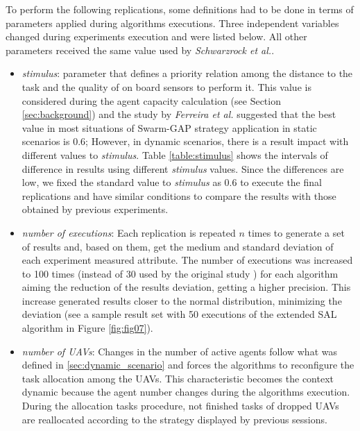 To perform the following replications, some definitions had to be done in terms of parameters applied during algorithms executions. Three independent variables changed during experiments execution and were listed below. All other parameters received the same value used by \textit{Schwarzrock et al.}\cite{MAS07}.
\begin{itemize}
   \item \textit{stimulus}: parameter that defines a priority relation among the distance to the task and the quality of on board sensors to perform it. This value is considered during the agent capacity calculation (see Section \ref{sec:background}) and the study by \textit{Ferreira et al.} \cite{ferreira2010robocup} suggested that the best value in most situations of Swarm-GAP strategy application in static scenarios is $0.6$; However, in dynamic scenarios, there is a result impact with different values to \textit{stimulus}. Table \ref{table:stimulus} shows the intervals of difference in results using different \textit{stimulus} values. Since the differences are low, we fixed the standard value to \textit{stimulus} as $0.6$ to execute the final replications and have similar conditions to compare the results with those obtained by previous experiments.
   \item \textit{number of executions}: Each replication is repeated $n$ times to generate a set of results and, based on them, get the medium and standard deviation of each experiment measured attribute. The number of executions was increased to 100 times (instead of 30 used by the original study \cite{MAS07}) for each algorithm aiming the reduction of the results deviation, getting a higher precision. This increase generated results closer to the normal distribution, minimizing the deviation (see a sample result set with 50 executions of the extended SAL algorithm in Figure \ref{fig:fig07}).
   \item \textit{number of UAVs}: Changes in the number of active agents follow what was defined in \ref{sec:dynamic_scenario} and forces the algorithms to reconfigure the task allocation among the UAVs. This characteristic becomes the context dynamic because the agent number changes during the algorithms execution. During the allocation tasks procedure, not finished tasks of dropped UAVs are reallocated according to the strategy displayed by previous sessions.
\end{itemize}


